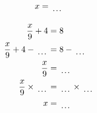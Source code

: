 \documentclass[12pt]{article}
\newcounter{minipagecount}
\begin{document}
\begin{multicols}{2}
\begin{minipage}[t]{0.45\textwidth}
\begin{align*}
        x &= \dotuline{\hspace{5mm}}\\
    \end{align*}
\end{minipage} %
\noindent{(\theminipagecount)}\hspace{0.1mm} %
\begin{minipage}[t]{0.45\textwidth} %
    \vspace{-26pt}  %
    \raggedright %
    \begin{align*} %
        \frac{x}{9} + 4 &= 8\\
        \frac{x}{9} + 4 - \dotuline{\hspace{5mm}} &= 8 - \dotuline{\hspace{5mm}}\\
        \frac{x}{9} &= \dotuline{\hspace{5mm}}\\
        \frac{x}{9} \times\dotuline{\hspace{5mm}} &= \dotuline{\hspace{5mm}} \times\dotuline{\hspace{5mm}}\\
        x &= \dotuline{\hspace{5mm}}\\
    \end{align*}
\end{minipage} %
\noindent{(\theminipagecount)}\hspace{0.1mm} %
\begin{minipage}[t]{0.45\textwidth} %
    \vspace{-26pt}  %

\end{minipage}
\end{multicols}
\end{document}
